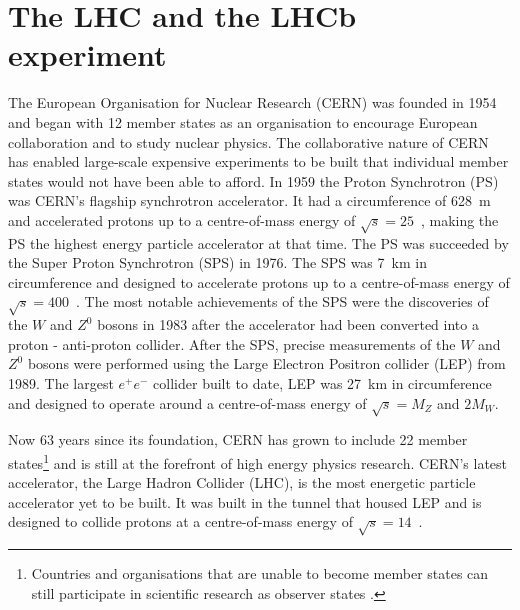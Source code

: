 \chapter{{\bf The LHC and the LHCb experiment}}
\label{CERN_LHC_LHCb}

The European Organisation for Nuclear Research (CERN) was founded in 1954 and began with 12 member states as an organisation to encourage European collaboration and to study nuclear physics. The collaborative nature of CERN has enabled large-scale expensive experiments to be built that individual member states would not have been able to afford. In 1959 the Proton Synchrotron (PS) was CERN's flagship synchrotron accelerator. It had a circumference of 628~m and accelerated protons up to a centre-of-mass energy of $\sqrt{s} = 25$~\gev, making the PS the highest energy particle accelerator at that time. 
The PS was succeeded by the Super Proton Synchrotron (SPS) in 1976. The SPS was 7~km in circumference and designed to accelerate protons up to a centre-of-mass energy of $\sqrt{s} = 400$~\gev. The most notable achievements of the SPS were the discoveries of the $W$ and $Z^0$ bosons in 1983 after the accelerator had been converted into a proton - anti-proton collider. After the SPS, precise measurements of the $W$ and $Z^0$ bosons were performed using the Large Electron Positron collider (LEP) from 1989. The largest $e^+e^-$ collider built to date, LEP was 27~km in circumference and designed to operate around a centre-of-mass energy of $\sqrt{s} = M_{Z}$ and $2M_{W}$. %

Now 63 years since its foundation, CERN has grown to include 22 member states\footnote{Countries and organisations that are unable to become member states can still participate in scientific research as observer states \cite{Member_States}.} and is still at the forefront of high energy physics research. CERN’s latest accelerator, the Large Hadron Collider (LHC), is the most energetic particle accelerator yet to be built. It was built in the tunnel that housed LEP and is designed to collide protons at a centre-of-mass energy of $\sqrt{s} = 14$~\tev. 

